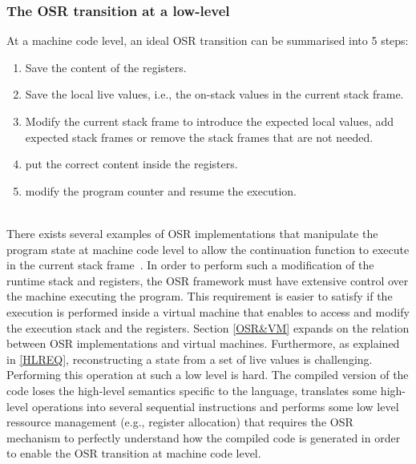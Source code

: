 \subsubsection{The OSR transition at a low-level}
At a machine code level, an ideal OSR transition can be summarised into 5 steps: 
\begin{enumerate}
    \item Save the content of the registers.
    \item Save the local live values, i.e., the on-stack values in the current stack frame.
    \item Modify the current stack frame to introduce the expected local values, add expected stack frames or remove the stack frames that are not needed.
    \item put the correct content inside the registers.
    \item modify the program counter and resume the execution.
\end{enumerate}\\

There exists several examples of OSR implementations that manipulate the program state at machine code level to allow the continuation function to execute in the current stack frame~\cite{chambers1991making, holzle1992debugging, suganuma2006region}.
In order to perform such a modification of the runtime stack and registers, the OSR framework must have extensive control over the machine executing the program.
This requirement is easier to satisfy if the execution is performed inside a virtual machine that enables to access and modify the execution stack and the registers.
Section \ref{OSR&VM} expands on the relation between OSR implementations and virtual machines.
Furthermore, as explained in \ref{HLREQ}, reconstructing a state from a set of live values is challenging. 
Performing this operation at such a low level is hard.
The compiled version of the code loses the high-level semantics specific to the language, translates some high-level operations into several sequential instructions and performs some low level ressource management (e.g., register allocation) that requires the OSR mechanism to perfectly understand how the compiled code is generated in order to enable the OSR transition at machine code level.\\

